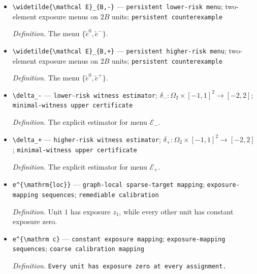 \documentclass{article}
\begin{document}
\begin{itemize}
  \item \texttt{\textbackslash{}\allowbreak{}widetilde\{\textbackslash{}\allowbreak{}mathcal E\}\allowbreak{}\_\allowbreak{}\{B,\allowbreak{}-\allowbreak{}\}\allowbreak{}} --- \texttt{persistent lower-\allowbreak{}risk menu}; two-element exposure menus on \(2B\) units; \texttt{persistent counterexample}
  \par\smallskip\noindent\emph{Definition.} The menu \(\{\widetilde e^0,\widetilde e^-\}\).
  \item \texttt{\textbackslash{}\allowbreak{}widetilde\{\textbackslash{}\allowbreak{}mathcal E\}\allowbreak{}\_\allowbreak{}\{B,\allowbreak{}+\allowbreak{}\}\allowbreak{}} --- \texttt{persistent higher-\allowbreak{}risk menu}; two-element exposure menus on \(2B\) units; \texttt{persistent counterexample}
  \par\smallskip\noindent\emph{Definition.} The menu \(\{\widetilde e^0,\widetilde e^+\}\).
  \item \texttt{\textbackslash{}\allowbreak{}delta\_\allowbreak{}-\allowbreak{}} --- \texttt{lower-\allowbreak{}risk witness estimator}; \(\delta_-:\Omega_2\times[-1,1]^2\to[-2,2]\); \texttt{minimal-\allowbreak{}witness upper certificate}
  \par\smallskip\noindent\emph{Definition.} The explicit estimator for menu \(\mathcal E_-\).
  \item \texttt{\textbackslash{}\allowbreak{}delta\_\allowbreak{}+\allowbreak{}} --- \texttt{higher-\allowbreak{}risk witness estimator}; \(\delta_+:\Omega_2\times[-1,1]^2\to[-2,2]\); \texttt{minimal-\allowbreak{}witness upper certificate}
  \par\smallskip\noindent\emph{Definition.} The explicit estimator for menu \(\mathcal E_+\).
  \item \texttt{e\textasciicircum{}\{\textbackslash{}\allowbreak{}mathrm\{loc\}\allowbreak{}\}\allowbreak{}} --- \texttt{graph-\allowbreak{}local sparse-\allowbreak{}target mapping}; \texttt{exposure-\allowbreak{}mapping sequences}; \texttt{remediable calibration}
  \par\smallskip\noindent\emph{Definition.} Unit \(1\) has exposure \(z_1\), while every other unit has constant exposure zero.
  \item \texttt{e\textasciicircum{}\{\textbackslash{}\allowbreak{}mathrm c\}\allowbreak{}} --- \texttt{constant exposure mapping}; \texttt{exposure-\allowbreak{}mapping sequences}; \texttt{coarse calibration mapping}
  \par\smallskip\noindent\emph{Definition.} \texttt{Every unit has exposure zero at every assignment.}

\end{itemize}
\end{document}
